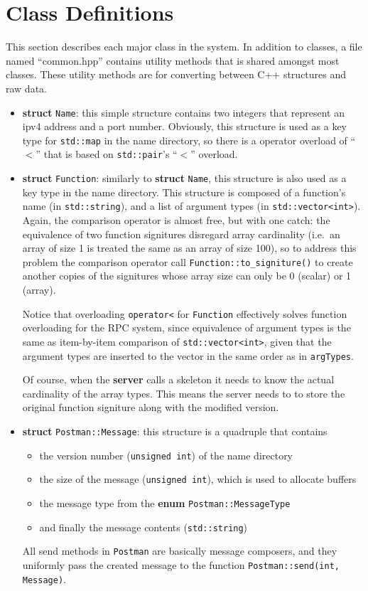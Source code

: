 \section{Class Definitions}
This section describes each major class in the system.
In addition to classes, a file named ``common.hpp'' contains utility methods that is shared amongst most classes.
These utility methods are for converting between C++ structures and raw data.

\begin{itemize}
\item
{\bf struct} {\tt Name}: this simple structure contains two integers that represent an ipv4 address and a port number.
Obviously, this structure is used as a key type for {\tt std::map} in the name directory, so there is a operator overload of ``$<$'' that is based on {\tt std::pair}'s ``$<$'' overload.

\item
{\bf struct} {\tt Function}: similarly to {\bf struct} {\tt Name}, this structure  is also used as a key type in the name directory.
This structure is composed of a function's name (in {\tt std::string}), and a list of argument types (in {\tt std::vector<int>}).
Again, the comparison operator is almost free, but with one catch: the equivalence of two function signitures disregard array cardinality (i.e.\ an array of size 1 is treated the same as an array of size 100), so to address this problem the comparison operator call {\tt Function::to\_signiture()} to create another copies of the signitures whose array size can only be 0 (scalar) or 1 (array).

Notice that overloading {\tt operator<} for {\tt Function} effectively solves function overloading for the RPC system, since equivalence of argument types is the same as item-by-item comparison of {\tt std::vector<int>}, given that the argument types are inserted to the vector in the same order as in {\tt argTypes}.

Of course, when the {\bf server} calls a skeleton it needs to know the actual cardinality of the array types.
This means the server needs to to store the original function signiture along with the modified version.

\item
{\bf struct} {\tt Postman::Message}: this structure is a quadruple that contains
\begin{itemize}
\item
the version number ({\tt unsigned int}) of the name directory
\item
the size of the message ({\tt unsigned int}), which is used to allocate buffers
\item
the message type from the {\bf enum} {\tt Postman::MessageType}
\item
and finally the message contents ({\tt std::string})
\end{itemize}
All send methods in {\tt Postman} are basically message composers, and they uniformly pass the created message to the function {\tt Postman::send(int, Message)}.


\end{itemize}
